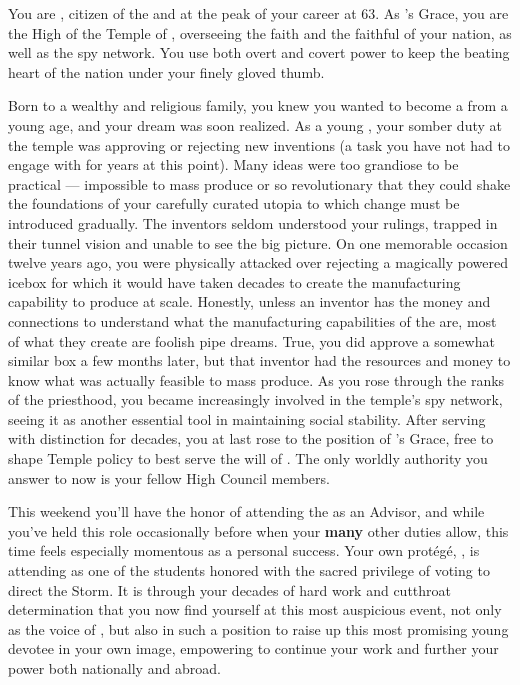 \documentclass[char]{GL2020}
\begin{document}
\name{\cAntiChup{}}

You are \cAntiChup{\intro}, citizen of the \pTech{} and at the peak of your career at 63. As \cTechGod{\intro}'s Grace, you are the High \cAntiChup{\Cleric} of the Temple of \cTechGod{}, overseeing the faith and the faithful of your nation, as well as the \pTech{} spy network. You use both overt and covert power to keep the beating heart of the nation under your finely gloved thumb.

Born to a wealthy and religious family, you knew you wanted to become a \cAntiChup{\cleric} from a young age, and your dream was soon realized. As a young \cAntiChup{\cleric}, your somber duty at the temple was approving or rejecting new inventions (a task you have not had to engage with for years at this point). Many ideas were too grandiose to be practical — impossible to mass produce or so revolutionary that they could shake the foundations of your carefully curated utopia to which change must be introduced gradually. The inventors seldom understood your rulings, trapped in their tunnel vision and unable to see the big picture. On one memorable occasion twelve years ago, you were physically attacked over rejecting a magically powered icebox for which it would have taken decades to create the manufacturing capability to produce at scale. Honestly, unless an inventor has the money and connections to understand what the manufacturing capabilities of the \pTech{} are, most of what they create are foolish pipe dreams. True, you did approve a somewhat similar box a few months later, but that inventor had the resources and money to know what was actually feasible to mass produce. As you rose through the ranks of the priesthood, you became increasingly involved in the temple's spy network, seeing it as another essential tool in maintaining social stability. After serving with distinction for decades, you at last rose to the position of \cTechGod{}'s Grace, free to shape Temple policy to best serve the will of \cTechGod{}. The only worldly authority you answer to now is your fellow High Council members.

This weekend you'll have the honor of attending the \pSchool{} as an Advisor, and while you've held this role occasionally before when your \textbf{many} other duties allow, this time feels especially momentous as a personal success. Your own protégé, \cScholarship{\intro}, is attending as one of the students honored with the sacred privilege of voting to direct the Storm. It is through your decades of hard work and cutthroat determination that you now find yourself at this most auspicious event, not only as the voice of \cTechGod{} \cTechGod{\themself}, but also in such a position to raise up this most promising young devotee in your own image, empowering \cScholarship{\them} to continue your work and further your power both nationally and abroad.  
\end{document}
